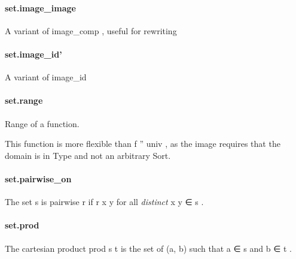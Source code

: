 \documentclass{article}
\begin{document}
\paragraph{set.image\_image}
\par
A variant of 
\colorbox[RGB]{253,246,227}{{{{\color[RGB]{101, 123, 131} image\_comp }}}}, useful for rewriting
\paragraph{set.image\_id'}
\par
A variant of 
\colorbox[RGB]{253,246,227}{{{{\color[RGB]{101, 123, 131} image\_id }}}}\paragraph{set.range}
\par
Range of a function.
\par
This function is more flexible than 
\colorbox[RGB]{253,246,227}{{{{\color[RGB]{101, 123, 131} f '' univ }}}}, as the image requires that the domain is in Type
and not an arbitrary Sort.
\paragraph{set.pairwise\_on}
\par
The set 
\colorbox[RGB]{253,246,227}{{{{\color[RGB]{101, 123, 131} s }}}} is pairwise 
\colorbox[RGB]{253,246,227}{{{{\color[RGB]{101, 123, 131} r }}}} if 
\colorbox[RGB]{253,246,227}{{{{\color[RGB]{101, 123, 131} r x y }}}} for all 
\emph{distinct
} 
\colorbox[RGB]{253,246,227}{{{{\color[RGB]{101, 123, 131} x y ∈ s }}}}.
\paragraph{set.prod}
\par
The cartesian product 
\colorbox[RGB]{253,246,227}{{{{\color[RGB]{101, 123, 131} prod s t }}}} is the set of 
\colorbox[RGB]{253,246,227}{{{{\color[RGB]{101, 123, 131} (a, b) }}}}such that 
\colorbox[RGB]{253,246,227}{{{{\color[RGB]{101, 123, 131} a ∈ s }}}} and 
\colorbox[RGB]{253,246,227}{{{{\color[RGB]{101, 123, 131} b ∈ t }}}}.
\end{document}
